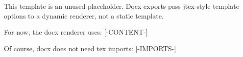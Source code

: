 This template is an unused placeholder. Docx exports pass jtex-style template options to a dynamic renderer, not a static template.

For now, the docx renderer uses:
[-CONTENT-]

Of course, docx does not need tex imports:
[-IMPORTS-]